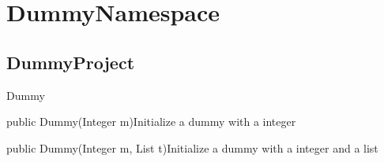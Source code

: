 \newcommand{\return}[2]{\textbf{Return values:} \begin{itemize} \item \texttt{#1} \\ Description: #2 \end{itemize}}



\section{DummyNamespace}
\subsection{DummyProject}
\begin{absclass}{Dummy} 



    \begin{attributes}
    \end{attributes}

    \begin{constructors}
        \begin{constructor}{public Dummy(Integer m)}{Initialize a dummy with a integer}
            \begin{parameters}
            \end{parameters}
        \end{constructor}

        \begin{constructor}{public Dummy(Integer m, List t)}{Initialize a dummy with a integer and a list}
            \begin{parameters}
            \end{parameters}
        \end{constructor}
    \end{constructors}



\end{absclass}
